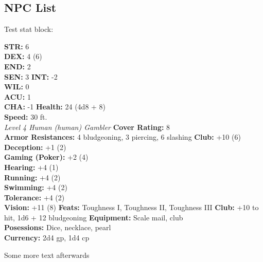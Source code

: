 \subsection{NPC List}

Test stat block:

{
    \textbf{STR:} 6 \\
    \textbf{DEX:} 4 (6) \\
    \textbf{END:} 2 \\
    \textbf{SEN:} 3
}
{
    \textbf{INT:} -2 \\
    \textbf{WIL:} 0 \\
    \textbf{ACU:} 1 \\
    \textbf{CHA:} -1
}
{
    \textbf{Health:} 24 (4d8 + 8) \\
    \textbf{Speed:} 30 ft. \\
    \textit{Level 4 Human (human) Gambler}
}
{
    \textbf{Cover Rating:} 8 \\
    \textbf{Armor Resistances:} 4 bludgeoning, 3 piercing, 6 slashing
}
{
    \textbf{Club:} +10 (6) \\
    \textbf{Deception:} +1 (2) \\
    \textbf{Gaming (Poker):} +2 (4) \\
    \textbf{Hearing:} +4 (1) \\
    \textbf{Running:} +4 (2) \\
    \textbf{Swimming:} +4 (2) \\
    \textbf{Tolerance:} +4 (2) \\
    \textbf{Vision:} +11 (8)
}
{
    \textbf{Feats:} Toughness I, Toughness II, Toughness III
}
{
    \textbf{Club:} +10 to hit, 1d6 + 12 bludgeoning
}
{
    \textbf{Equipment:} Scale mail, club \\
    \textbf{Posessions:} Dice, necklace, pearl \\
    \textbf{Currency:} 2d4 gp, 1d4 cp
}

Some more text afterwards
